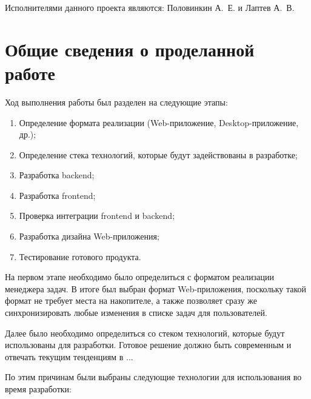 \documentclass{altsu-report}
\begin{document}
Исполнителями данного проекта являются: Половинкин А.~Е. и Лаптев А.~В.

\chapter{Общие сведения о проделанной работе}

Ход выполнения работы был разделен на следующие этапы:

\begin{enumerate}
    \item Определение формата реализации (Web-приложение, Desktop-приложение, др.);
    \item Определение стека технологий, которые будут задействованы в разработке;
    \item Разработка backend;
    \item Разработка frontend;
    \item Проверка интеграции frontend и backend;
    \item Разработка дизайна Web-приложения;
    \item Тестирование готового продукта.
\end{enumerate}

На первом этапе необходимо было определиться с форматом реализации менеджера задач. В итоге был выбран формат Web-приложения, поскольку такой формат не требует места на накопителе, а также позволяет сразу же синхронизировать любые изменения в списке задач для пользователей.

Далее было необходимо определиться со стеком технологий, которые будут использованы для разработки. Готовое решение должно быть современным и отвечать текущим тенденциям в ...

По этим причинам были выбраны следующие технологии для использования во время разработки:
\end{document}
